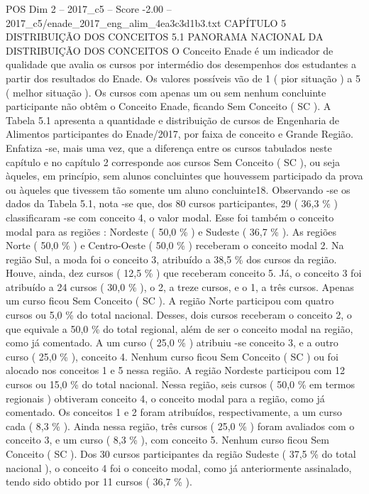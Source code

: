 \begin{textsample}{POS Dim 2 – 2017\_c5 – Score -2.00 – 2017\_c5/enade\_2017\_eng\_alim\_4ea3c3d1b3.txt}  \label{ex:f2_pos_389}
CAPÍTULO 5 DISTRIBUIÇÃO DOS CONCEITOS 5.1 PANORAMA NACIONAL DA DISTRIBUIÇÃO DOS CONCEITOS O Conceito Enade é um indicador de qualidade que avalia os cursos por intermédio dos desempenhos dos estudantes a partir dos resultados do Enade.
Os valores possíveis vão de 1 ( pior situação ) a 5 ( melhor situação ).
Os cursos com apenas um ou sem nenhum concluinte participante não obtêm o Conceito Enade, ficando Sem Conceito ( SC ).
A Tabela 5.1 apresenta a quantidade e distribuição de cursos de Engenharia de Alimentos participantes do Enade/2017, por faixa de conceito e Grande Região.
Enfatiza -se, mais uma vez, que a diferença entre os cursos tabulados neste capítulo e no capítulo 2 corresponde aos cursos Sem Conceito ( SC ), ou seja àqueles, em princípio, sem alunos concluintes que houvessem participado da prova ou àqueles que tivessem tão somente um aluno concluinte18.
Observando -se os dados da Tabela 5.1, nota -se que, dos 80 cursos participantes, 29 ( 36,3 \% ) classificaram -se com conceito 4, o valor modal.
Esse foi também o conceito modal para as regiões : Nordeste ( 50,0 \% ) e Sudeste ( 36,7 \% ).
As regiões Norte ( 50,0 \% ) e Centro-Oeste ( 50,0 \% ) receberam o conceito modal 2.
Na região Sul, a moda foi o conceito 3, atribuído a 38,5 \% dos cursos da região.
Houve, ainda, dez cursos ( 12,5 \% ) que receberam conceito 5.
Já, o conceito 3 foi atribuído a 24 cursos ( 30,0 \% ), o 2, a treze cursos, e o 1, a três cursos.
Apenas um curso ficou Sem Conceito ( SC ).
A região Norte participou com quatro cursos ou 5,0 \% do total nacional.
Desses, dois cursos receberam o conceito 2, o que equivale a 50,0 \% do total regional, além de ser o conceito modal na região, como já comentado.
A um curso ( 25,0 \% ) atribuiu -se conceito 3, e a outro curso ( 25,0 \% ), conceito 4.
Nenhum curso ficou Sem Conceito ( SC ) ou foi alocado nos conceitos 1 e 5 nessa região.
A região Nordeste participou com 12 cursos ou 15,0 \% do total nacional.
Nessa região, seis cursos ( 50,0 \% em termos regionais ) obtiveram conceito 4, o conceito modal para a região, como já comentado.
Os conceitos 1 e 2 foram atribuídos, respectivamente, a um curso cada ( 8,3 \% ).
Ainda nessa região, três cursos ( 25,0 \% ) foram avaliados com o conceito 3, e um curso ( 8,3 \% ), com conceito 5.
Nenhum curso ficou Sem Conceito ( SC ).
Dos 30 cursos participantes da região Sudeste ( 37,5 \% do total nacional ), o conceito 4 foi o conceito modal, como já anteriormente assinalado, tendo sido obtido por 11 cursos ( 36,7 \% ).

\end{textsample}
